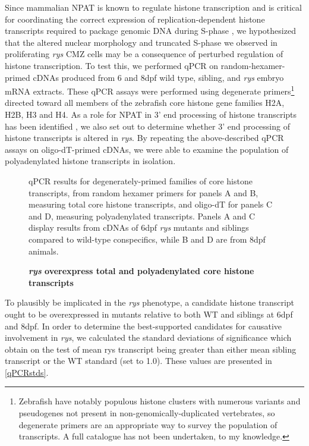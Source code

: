 Since mammalian NPAT is known to regulate histone transcription and is critical for coordinating the correct expression of replication-dependent histone transcripts required to package genomic DNA during S-phase \cite{Zhao2000}, we hypothesized that the altered nuclear morphology and truncated S-phase we observed in proliferating \textit{rys} CMZ cells may be a consequence of perturbed regulation of histone transcription. To test this, we performed qPCR on random-hexamer-primed cDNAs produced from 6 and 8dpf wild type, sibling, and \textit{rys} embryo mRNA extracts. These qPCR assays were performed using degenerate primers\footnote{Zebrafish have notably populous histone clusters with numerous variants and pseudogenes not present in non-genomically-duplicated vertebrates, so degenerate primers are an appropriate way to survey the population of transcripts. A full catalogue has not been undertaken, to my knowledge.} directed toward all members of the zebrafish core histone gene families H2A, H2B, H3 and H4. As a role for NPAT in 3’ end processing of histone transcripts has been identified \cite{Pirngruber2010}, we also set out to determine whether 3’ end processing of histone transcripts is altered in \textit{rys}. By repeating the above-described qPCR assays on oligo-dT-primed cDNAs, we were able to examine the population of polyadenylated histone transcripts in isolation. 

\begin{figure}[!h]
    \caption{{\bf \textit{rys} overexpress total and polyadenylated core histone transcripts}}
    qPCR results for degenerately-primed families of core histone transcripts, from random hexamer primers for panels A and B, measuring total core histone transcripts, and oligo-dT for panels C and D, measuring polyadenylated transcripts. Panels A and C display results from cDNAs of 6dpf \textit{rys} mutants and siblings compared to wild-type conspecifics, while B and D are from 8dpf animals.    
    \label{histonertpcr}
\end{figure}

To plausibly be implicated in the \textit{rys} phenotype, a candidate histone transcript ought to be overexpressed in mutants relative to both WT and siblings at 6dpf and 8dpf. In order to determine the best-supported candidates for causative involvement in \textit{rys}, we calculated the standard deviations of significance which obtain on the test of mean rys transcript being greater than either mean sibling transcript or the WT standard (set to 1.0). These values are presented in \autoref{qPCRstds}.

